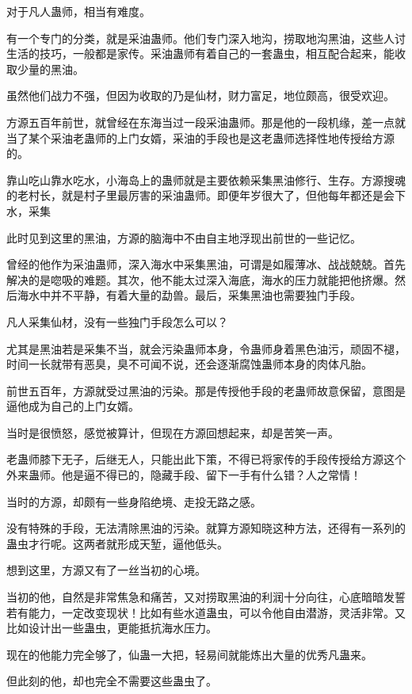 \begin{this_body}
对于凡人蛊师，相当有难度。

有一个专门的分类，就是采油蛊师。他们专门深入地沟，捞取地沟黑油，这些人讨生活的技巧，一般都是家传。采油蛊师有着自己的一套蛊虫，相互配合起来，能收取少量的黑油。

虽然他们战力不强，但因为收取的乃是仙材，财力富足，地位颇高，很受欢迎。

方源五百年前世，就曾经在东海当过一段采油蛊师。那是他的一段机缘，差一点就当了某个采油老蛊师的上门女婿，采油的手段也是这老蛊师选择性地传授给方源的。

靠山吃山靠水吃水，小海岛上的蛊师就是主要依赖采集黑油修行、生存。方源搜魂的老村长，就是村子里最厉害的采油蛊师。即便年岁很大了，但他每年都还是会下水，采集

此时见到这里的黑油，方源的脑海中不由自主地浮现出前世的一些记忆。

曾经的他作为采油蛊师，深入海水中采集黑油，可谓是如履薄冰、战战兢兢。首先解决的是唿吸的难题。其次，他不能太过深入海底，海水的压力就能把他挤爆。然后海水中并不平静，有着大量的勐兽。最后，采集黑油也需要独门手段。

凡人采集仙材，没有一些独门手段怎么可以？

尤其是黑油若是采集不当，就会污染蛊师本身，令蛊师身着黑色油污，顽固不褪，时间一长就带有恶臭，臭不可闻不说，还会逐渐腐蚀蛊师本身的肉体凡胎。

前世五百年，方源就受过黑油的污染。那是传授他手段的老蛊师故意保留，意图是逼他成为自己的上门女婿。

当时是很愤怒，感觉被算计，但现在方源回想起来，却是苦笑一声。

老蛊师膝下无子，后继无人，只能出此下策，不得已将家传的手段传授给方源这个外来蛊师。他是逼不得已的，隐藏手段、留下一手有什么错？人之常情！

当时的方源，却颇有一些身陷绝境、走投无路之感。

没有特殊的手段，无法清除黑油的污染。就算方源知晓这种方法，还得有一系列的蛊虫才行呢。这两者就形成天堑，逼他低头。

想到这里，方源又有了一丝当初的心境。

当初的他，自然是非常焦急和痛苦，又对捞取黑油的利润十分向往，心底暗暗发誓若有能力，一定改变现状！比如有些水道蛊虫，可以令他自由潜游，灵活非常。又比如设计出一些蛊虫，更能抵抗海水压力。

现在的他能力完全够了，仙蛊一大把，轻易间就能炼出大量的优秀凡蛊来。

但此刻的他，却也完全不需要这些蛊虫了。


\end{this_body}
